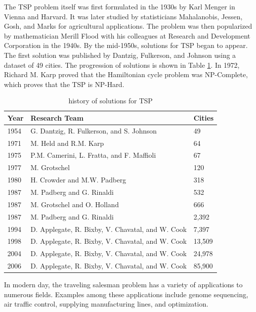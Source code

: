 \documentclass[10pt,twocolumn,letterpaper]{article}
\begin{document}
The TSP problem itself was first formulated in the 1930s
by Karl Menger in Vienna and Harvard. It was later studied
by statisticians Mahalanobis, Jessen, Gosh, and Marks for
agricultural applications. The problem was then popularized by mathematician Merill Flood with his colleagues at
Research and Development Corporation in the 1940s. By
the mid-1950s, solutions for TSP began to appear. The first
solution was published by Dantzig, Fulkerson, and Johnson
using a dataset of 49 cities. The progression of solutions is
shown in Table \ref{fig:hist}. In 1972, Richard M. Karp proved that
the Hamiltonian cycle problem was NP-Complete, which
proves that the TSP is NP-Hard.
\begin{table}[]
	\centering
\caption{history of solutions for TSP\cite{haqueempirical}}
\label{fig:hist}
	\begin{tabular}{l|l|l}
		\hline
		Year & Research Team                                    & Cities \\ \hline
		1954 & G. Dantzig, R. Fulkerson, and S. Johnson         & 49     \\ \hline
		1971 & M. Held and R.M. Karp                            & 64     \\ \hline
		1975 & P.M. Camerini, L. Fratta, and F. Maffioli        & 67     \\ \hline
		1977 & M. Grotschel                                     & 120    \\ \hline
		1980 & H. Crowder and M.W. Padberg                      & 318    \\ \hline
		1987 & M. Padberg and G. Rinaldi                        & 532    \\ \hline
		1987 & M. Grotschel and O. Holland                      & 666    \\ \hline
		1987 & M. Padberg and G. Rinaldi                        & 2,392  \\ \hline
		1994 & D. Applegate, R. Bixby, V. Chavatal, and W. Cook & 7,397  \\ \hline
		1998 & D. Applegate, R. Bixby, V. Chavatal, and W. Cook & 13,509 \\ \hline
		2004 & D. Applegate, R. Bixby, V. Chavatal, and W. Cook & 24,978 \\ \hline
		2006 & D. Applegate, R. Bixby, V. Chavatal, and W. Cook & 85,900\\ \hline
	\end{tabular}
\end{table}


In modern day, the traveling salesman problem has a variety of applications to numerous fields. Examples among
these applications include genome sequencing, air traffic control, supplying manufacturing lines, and optimization.
\end{document}
